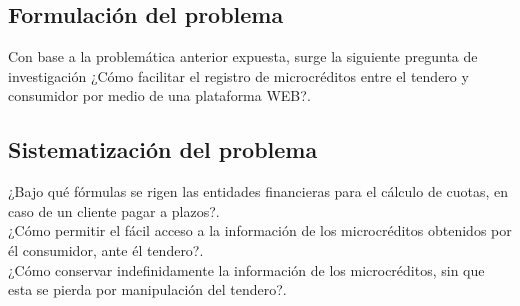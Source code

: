 	\subsection{Formulación del problema}
	
	{Con base a la problemática anterior expuesta, surge la siguiente pregunta de investigación ¿Cómo facilitar el registro de microcréditos entre el tendero y consumidor por medio de una plataforma WEB?.}
	
	\subsection{Sistematización del problema}
	
	{¿Bajo qué fórmulas se rigen las entidades financieras para el cálculo de cuotas, en caso de un cliente pagar a plazos?.\\
		
	¿Cómo permitir el fácil acceso a la información de los microcréditos obtenidos por él consumidor, ante él tendero?.\\
	
	¿Cómo conservar indefinidamente la información de los microcréditos, sin que esta se pierda por manipulación del tendero?.\\
	}